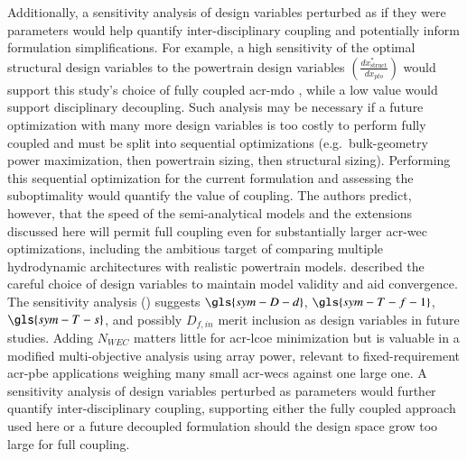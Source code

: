     Additionally, a sensitivity analysis of design variables perturbed as if they were parameters would help quantify inter-disciplinary coupling and potentially inform formulation simplifications.
    For example, a high sensitivity of the optimal structural design variables to the powertrain design variables $\left(\frac{dx^*_{\text{struct}}}{dx_{pto}}\right)$ would support this study's choice of fully coupled \gls{acr-mdo} \citep{mccabe_development_2026}, while a low value would support disciplinary decoupling.
    Such analysis may be necessary if a future optimization with many more design variables is too costly to perform fully coupled and must be split into sequential optimizations (e.g.\ bulk-geometry power maximization, then powertrain sizing, then structural sizing).
    Performing this sequential optimization for the current formulation and assessing the suboptimality would quantify the value of coupling.
    The authors predict, however, that the speed of the semi-analytical models and the extensions discussed here will permit full coupling even for substantially larger \gls{acr-wec} optimizations, including the ambitious target of comparing multiple hydrodynamic architectures with realistic powertrain models.
\else
     described the careful choice of design variables to maintain model validity and aid convergence.
    The sensitivity analysis () suggests $\gls{sym-D-d}$, $\gls{sym-T-f-1}$, $\gls{sym-T-s}$, and possibly $D_{f,in}$ merit inclusion as design variables in future studies.
    Adding $N_{WEC}$ matters little for \gls{acr-lcoe} minimization but is valuable in a modified multi-objective analysis using array power, relevant to fixed-requirement \gls{acr-pbe} applications weighing many small \glspl{acr-wec} against one large one.
    A sensitivity analysis of design variables perturbed as parameters would further quantify inter-disciplinary coupling, supporting either the fully coupled approach used here \citep{mccabe_development_2026} or a future decoupled formulation should the design space grow too large for full coupling.
\fi

